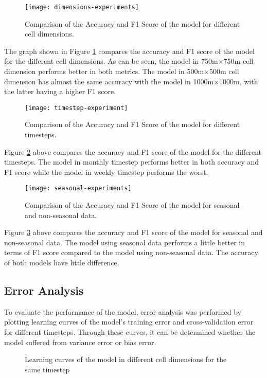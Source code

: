     \begin{figure}[H]
    \centering
    \texttt{[image: dimensions-experiments]}
    \caption{Comparison of the Accuracy and F1 Score of the model for different cell dimensions.}
    \label{fig:dimension-experiments}
    \end{figure}
    The graph shown in Figure \ref{fig:dimension-experiments} compares the accuracy and F1 score of the model for the different cell dimensions. As can be seen, the model in 750m\(\times\)750m cell dimension performs better in both metrics. The model in 500m\(\times\)500m cell dimension has almost the same accuracy with the model in 1000m\(\times\)1000m, with the latter having a higher F1 score.

    \begin{figure}[H]
    \centering
    \texttt{[image: timestep-experiment]}
    \caption{Comparison of the Accuracy and F1 Score of the model for different timesteps.}
    \label{fig:timestep-experiments}
    \end{figure}
    Figure \ref{fig:timestep-experiments} above compares the accuracy and F1 score of the model for the different timesteps. The model in monthly timestep performs better in both accuracy and F1 score while the model in weekly timestep performs the worst.
    
    \begin{figure}[H]
    \centering
    \texttt{[image: seasonal-experiments]}
    \caption{Comparison of the Accuracy and F1 Score of the model for seasonal and non-seasonal data.}
    \label{fig:seasonal-experiments}
    \end{figure}
    Figure \ref{fig:seasonal-experiments} above compares the accuracy and F1 score of the model for seasonal and non-seasonal data. The model using seasonal data performs a little better in terms of F1 score compared to the model using non-seasonal data. The accuracy of both models have little difference.

\subsection{Error Analysis}
    To evaluate the performance of the model, error analysis was performed by plotting learning curves of the model's training error and cross-validation error for different timesteps. Through these curves, it can be determined whether the model suffered from variance error or bias error.

    \begin{figure}[H]
    \centering
    \caption{Learning curves of the model in different cell dimensions for the same timestep}
    \label{fig:dimension-learning-curve}
    \end{figure}

